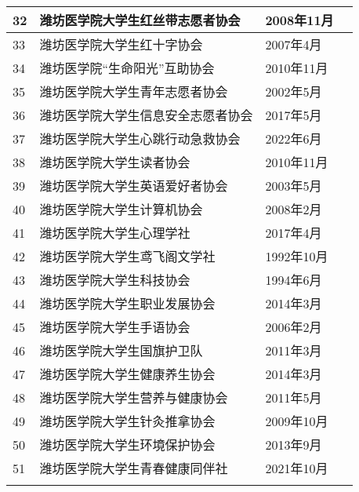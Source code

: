 \begin{center}
    \begin{tabular}{|>{\centering\arraybackslash}p{}|>{\centering\arraybackslash}p{}|>{\centering\arraybackslash}p{}|>{\centering\arraybackslash}p{}|}
        \Xhline{1.2pt}
        32 & 潍坊医学院大学生红丝带志愿者协会  & 2008年11月 & \multirow{6}{*}{志愿公益类} \\
        \cline{1-3}
        33 & 潍坊医学院大学生红十字协会     & 2007年4月  &                        \\
        \cline{1-3}
        34 & 潍坊医学院“生命阳光”互助协会   & 2010年11月 &                        \\
        \cline{1-3}
        35 & 潍坊医学院大学生青年志愿者协会   & 2002年5月  &                        \\
        \cline{1-3}
        36 & 潍坊医学院大学生信息安全志愿者协会 & 2017年5月  &                        \\
        \cline{1-3}
        37 & 潍坊医学院大学生心跳行动急救协会  & 2022年6月  &                        \\
        \Xhline{1.2pt}
        38 & 潍坊医学院大学生读者协会      & 2010年11月 & \multirow{5}{*}{学术科技类} \\
        \cline{1-3}
        39 & 潍坊医学院大学生英语爱好者协会   & 2003年5月  &                        \\
        \cline{1-3}
        40 & 潍坊医学院大学生计算机协会     & 2008年2月  &                        \\
        \cline{1-3}
        41 & 潍坊医学院大学生心理学社      & 2017年4月  &                        \\
        \cline{1-3}
        42 & 潍坊医学院大学生鸢飞阁文学社    & 1992年10月 &                        \\
        \Xhline{1.2pt}
        43 & 潍坊医学院大学生科技协会      & 1994年6月  & \multirow{2}{*}{创新创业类} \\
        \cline{1-3}
        44 & 潍坊医学院大学生职业发展协会    & 2014年3月  &                        \\
        \Xhline{1.2pt}
        45 & 潍坊医学院大学生手语协会      & 2006年2月  & \multirow{7}{*}{自律互助类} \\
        \cline{1-3}
        46 & 潍坊医学院大学生国旗护卫队     & 2011年3月  &                        \\
        \cline{1-3}
        47 & 潍坊医学院大学生健康养生协会    & 2014年3月  &                        \\
        \cline{1-3}
        48 & 潍坊医学院大学生营养与健康协会   & 2011年5月  &                        \\
        \cline{1-3}
        49 & 潍坊医学院大学生针灸推拿协会    & 2009年10月 &                        \\
        \cline{1-3}
        50 & 潍坊医学院大学生环境保护协会    & 2013年9月  &                        \\
        \cline{1-3}
        51 & 潍坊医学院大学生青春健康同伴社   & 2021年10月 &                        \\
        \Xhline{1.2pt}
    \end{tabular}
\end{center}
